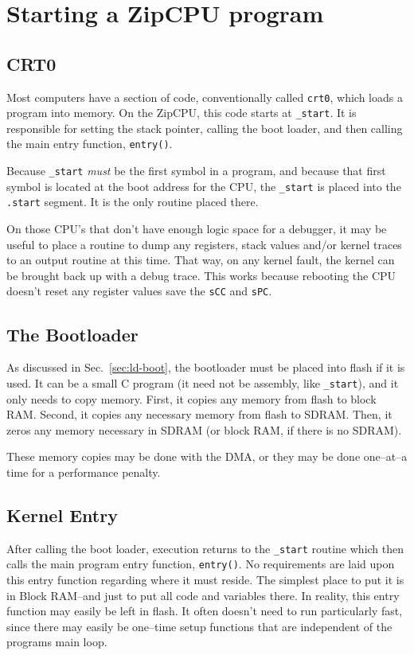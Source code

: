 \documentclass{gqtekspec}
\begin{document}
%
\section{Starting a ZipCPU program}
\subsection{CRT0}

Most computers have a section of code, conventionally called {\tt crt0}, which
loads a program into memory.  On the ZipCPU, this code starts at {\tt \_start}.
It is responsible for setting the stack pointer, calling the boot loader,
and then calling the main entry function, {\tt entry()}.

Because {\tt \_start} {\em must} be the first symbol in a program, and because
that first symbol is located at the boot address for the CPU, the {\tt \_start}
is placed into the {\tt .start} segment.  It is the only routine placed there.

On those CPU's that don't have enough logic space for a debugger, it may be
useful to place a routine to dump any registers, stack values and/or kernel
traces to an output routine at this time.  That way, on any kernel fault, the
kernel can be brought back up with a debug trace.  This works because rebooting
the CPU doesn't reset any register values save the {\tt sCC} and {\tt sPC}.

\subsection{The Bootloader}

As discussed in Sec.~\ref{sec:ld-boot}, the bootloader must be placed into 
flash if it is used.  It can be a small C program (it need not be assembly,
like {\tt \_start}), and it only needs to copy memory.  First, it copies any
memory from flash to block RAM.  Second, it copies any necessary memory from
flash to SDRAM.  Then, it zeros any memory necessary in SDRAM (or block RAM,
if there is no SDRAM).

These memory copies may be done with the DMA, or they may be done one--at--a
time for a performance penalty.

\subsection{Kernel Entry}

After calling the boot loader, execution returns to the {\tt \_start} routine
which then calls the main program entry function, {\tt entry()}.  No
requirements are laid upon this entry function regarding where it must reside.
The simplest place to put it is in Block RAM--and just to put all code and
variables there.  In reality, this entry function may easily be left in flash.
It often doesn't need to run particularly fast, since there may easily be
one--time setup functions that are independent of the programs main loop.
\end{document}
